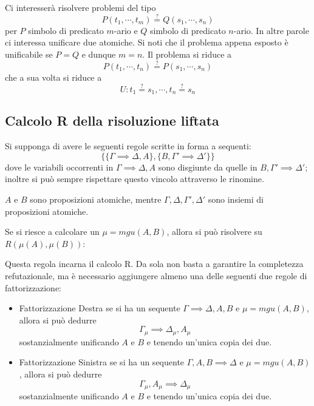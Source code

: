 Ci interesserà risolvere problemi del tipo 
$$
P(t_1, \cdots, t_m) \stackrel{?}{=} Q(s_1, \cdots, s_n)
$$
per $P$ simbolo di predicato $m$-ario e $Q$ simbolo di predicato $n$-ario. In 
altre parole ci interessa unificare due atomiche. Si noti che il problema appena 
esposto è unificabile se $P = Q$ e dunque $m = n$. Il problema si riduce a 
$$
P(t_1, \cdots, t_n) \stackrel{?}{=} P(s_1, \cdots, s_n)
$$
che a sua volta si riduce a 
$$
U: t_1 \stackrel{?}{=}s_1, \cdots, t_n \stackrel{?}{=}s_n
$$

\subsection{Calcolo R della risoluzione liftata}
Si supponga di avere le seguenti regole scritte in forma 
a sequenti: 
$$
\{\{\Gamma \implies \Delta, A\}, \{B, \Gamma' \implies \Delta'\}\}
$$
dove le variabili occorrenti in $\Gamma \implies \Delta, A$ sono 
disgiunte da quelle in $B, \Gamma' \implies \Delta'$; inoltre si può 
sempre rispettare questo vincolo attraverso le rinomine. 

$A$ e $B$ sono proposizioni atomiche, mentre $\Gamma, \Delta, \Gamma', \Delta'$ 
sono insiemi di proposizioni atomiche. 

Se si riesce a calcolare un $\mu = mgu(A,B)$, allora si può risolvere
su $R(\mu(A), \mu(B))$: 
\begin{prooftree}
\end{prooftree}

Questa regola incarna il calcolo R. Da sola non basta a garantire la completezza 
refutazionale, ma è necessario aggiungere almeno una delle seguenti due 
regole di fattorizzazione: 
\begin{itemize}
        \item{Fattorizzazione Destra} se si 
                ha un sequente $\Gamma \implies \Delta, A, B$ e $\mu = mgu(A,B)$, allora 
                si può dedurre
                $$
                \Gamma_{\mu} \implies \Delta_{\mu}, A_{\mu}
                $$
        sostanzialmente unificando $A$ e $B$ e tenendo un'unica copia dei due. 
        \item{Fattorizzazione Sinistra}
                se si 
                ha un sequente $\Gamma, A, B \implies \Delta$ e $\mu = mgu(A,B)$, allora 
                si può dedurre
                $$
                \Gamma_{\mu},A_{\mu} \implies \Delta_{\mu}
                $$
        sostanzialmente unificando $A$ e $B$ e tenendo un'unica copia dei due. 
\end{itemize}

